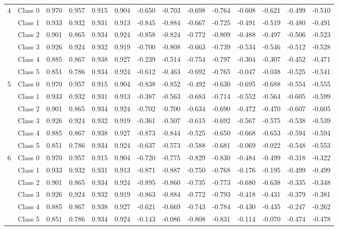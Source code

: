 \begin{table*}[t]
\begin{tabular}{l|l|rrrr|rrrr|rrrr}
\midrule
\multirow{6}{*}{4} 
&Class 0 & 0.970 & 0.957 & 0.915 & 0.904 & -0.650 & -0.703 & -0.698 & -0.764 & -0.608 & -0.621 & -0.499 & -0.510 \\
&Class 1 & 0.933 & 0.932 & 0.931 & 0.913 & -0.845 & -0.884 & -0.667 & -0.725 & -0.491 & -0.519 & -0.480 & -0.491 \\
&Class 2 & 0.901 & 0.865 & 0.934 & 0.924 & -0.858 & -0.824 & -0.772 & -0.809 & -0.488 & -0.497 & -0.506 & -0.523 \\
&Class 3 & 0.926 & 0.924 & 0.932 & 0.919 & -0.700 & -0.808 & -0.663 & -0.739 & -0.534 & -0.546 & -0.512 & -0.528 \\
&Class 4 & 0.885 & 0.867 & 0.938 & 0.927 & -0.239 & -0.514 & -0.754 & -0.797 & -0.304 & -0.307 & -0.452 & -0.471 \\
&Class 5 & 0.851 & 0.786 & 0.934 & 0.924 & -0.612 & -0.463 & -0.692 & -0.765 & -0.047 & -0.038 & -0.525 & -0.541 \\
\midrule
\multirow{6}{*}{5} 
&Class 0 & 0.970 & 0.957 & 0.915 & 0.904 & -0.838 & -0.852 & -0.492 & -0.630 & -0.695 & -0.688 & -0.554 & -0.555 \\
&Class 1 & 0.933 & 0.932 & 0.931 & 0.913 & -0.387 & -0.563 & -0.683 & -0.714 & -0.552 & -0.564 & -0.605 & -0.599 \\
&Class 2 & 0.901 & 0.865 & 0.934 & 0.924 & -0.702 & -0.700 & -0.634 & -0.690 & -0.472 & -0.470 & -0.607 & -0.605 \\
&Class 3 & 0.926 & 0.924 & 0.932 & 0.919 & -0.361 & -0.507 & -0.615 & -0.692 & -0.567 & -0.575 & -0.538 & -0.539 \\
&Class 4 & 0.885 & 0.867 & 0.938 & 0.927 & -0.873 & -0.844 & -0.525 & -0.650 & -0.668 & -0.653 & -0.594 & -0.594 \\
&Class 5 & 0.851 & 0.786 & 0.934 & 0.924 & -0.637 & -0.573 & -0.588 & -0.681 & -0.069 & -0.022 & -0.548 & -0.553 \\
\midrule
\multirow{6}{*}{6} 
&Class 0 & 0.970 & 0.957 & 0.915 & 0.904 & -0.720 & -0.775 & -0.829 & -0.830 & -0.484 & -0.499 & -0.318 & -0.322 \\
&Class 1 & 0.933 & 0.932 & 0.931 & 0.913 & -0.871 & -0.887 & -0.750 & -0.768 & -0.176 & -0.195 & -0.499 & -0.499 \\
&Class 2 & 0.901 & 0.865 & 0.934 & 0.924 & -0.895 & -0.860 & -0.735 & -0.773 & -0.680 & -0.638 & -0.335 & -0.348 \\
&Class 3 & 0.926 & 0.924 & 0.932 & 0.919 & -0.863 & -0.884 & -0.772 & -0.793 & -0.418 & -0.431 & -0.379 & -0.381 \\
&Class 4 & 0.885 & 0.867 & 0.938 & 0.927 & -0.621 & -0.669 & -0.743 & -0.784 & -0.430 & -0.435 & -0.247 & -0.262 \\
&Class 5 & 0.851 & 0.786 & 0.934 & 0.924 & -0.143 & -0.086 & -0.808 & -0.831 & -0.114 & -0.070 & -0.474 & -0.478 \\

\bottomrule
\end{tabular}

\label{tab:layer_abiliation_emotions_1}
\end{table*}

